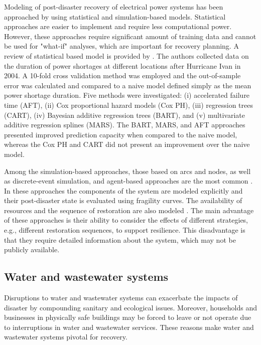 Modeling of post-disaster recovery of electrical power systems has been approached by using statistical and simulation-based models. Statistical approaches are easier to implement and require less computational power. However, these approaches require significant amount of training data and cannot be used for "what-if" analyses, which are important for recovery planning. A review of statistical based model is provided by \cite{liu2007statistical}. The authors collected data on the duration of power shortages at different locations after Hurricane Ivan in 2004. A 10-fold cross validation method was employed and the out-of-sample error was calculated and compared to a naive model defined simply as the mean power shortage duration. Five methods were investigated: (i) accelerated failure time (AFT), (ii) Cox proportional hazard models (Cox PH), (iii) regression trees (CART), (iv) Bayesian additive regression trees (BART), and (v) multivariate additive regression splines (MARS). The BART, MARS, and AFT approaches presented improved prediction capacity when compared to the naive model, whereas the Cox PH and CART did not present an improvement over the naive model. \ 

Among the simulation-based approaches, those based on arcs and nodes, as well as discrete-event simulation, and agent-based approaches are the most common \citep{Eusgeld2008a,Ouyang2014a,sun2019resilience}. In these approaches the components of the system are modeled explicitly and their post-disaster state is evaluated using fragility curves. The availability of resources and the sequence of restoration are also modeled \citep{ouyang2014multi}. The main advantage of these approaches is their ability to consider the effects of different strategies, e.g., different restoration sequences, to support resilience. This disadvantage is that they require detailed information about the system, which may not be publicly available. \ 

\subsection{Water and wastewater systems}
Disruptions to water and wastewater systems can exacerbate the impacts of disaster by compounding sanitary and ecological issues. Moreover, households and businesses in physically safe buildings may be forced to leave or not operate due to interruptions in water and wastewater services. These reasons make water and wastewater systems pivotal for recovery.\

